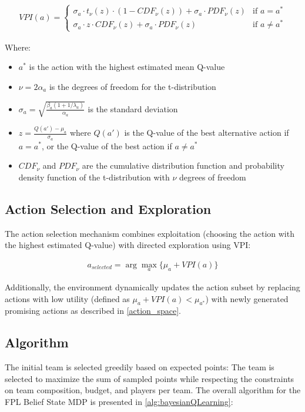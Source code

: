 \begin{align}
VPI(a) = \begin{cases}
\sigma_a \cdot t_{\nu}(z) \cdot (1 - CDF_{\nu}(z)) + \sigma_a \cdot PDF_{\nu}(z) & \text{if } a = a^*\\
\sigma_a \cdot z \cdot CDF_{\nu}(z) + \sigma_a \cdot PDF_{\nu}(z) & \text{if } a \neq a^*
\end{cases}
\end{align}

Where:
\begin{itemize}
    \item $a^*$ is the action with the highest estimated mean Q-value
    \item $\nu = 2\alpha_a$ is the degrees of freedom for the t-distribution
    \item $\sigma_a = \sqrt{\frac{\beta_a(1+1/\lambda_a)}{\alpha_a}}$ is the standard deviation
    \item $z = \frac{Q(a') - \mu_a}{\sigma_a}$ where $Q(a')$ is the Q-value of the best alternative action if $a = a^*$, or the Q-value of the best action if $a \neq a^*$
    \item $CDF_{\nu}$ and $PDF_{\nu}$ are the cumulative distribution function and probability density function of the t-distribution with $\nu$ degrees of freedom
\end{itemize}

\subsection{Action Selection and Exploration}

The action selection mechanism combines exploitation (choosing the action with the highest estimated Q-value) with directed exploration using VPI:

\begin{align}
a_{selected} = \arg\max_a \{\mu_a + VPI(a)\}
\end{align}

Additionally, the environment dynamically updates the action subset by replacing actions with low utility (defined as $\mu_a + VPI(a) < \mu_{a^*}$) with newly generated promising actions as described in \ref{action_space}. \cite{matthews2012}

\subsection{Algorithm}
The initial team is selected greedily based on expected points:
The team is selected to maximize the sum of sampled points while respecting the constraints on team composition, budget, and players per team.
The overall algorithm for the FPL Belief State MDP is presented in \ref{alg:bayesianQLearning}:

